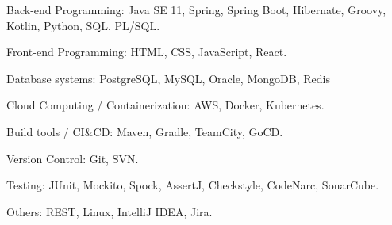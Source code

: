 

\begin{cvskills}


  \cvskill
    {Back-end Programming:} %
    {Java SE 11, Spring, Spring Boot, Hibernate, Groovy, Kotlin, Python, SQL, PL/SQL.} %

  \cvskill
    {Front-end Programming:} %
    {HTML, CSS, JavaScript, React.} %

  \cvskill
    {Database systems:} %
    {PostgreSQL, MySQL, Oracle, MongoDB, Redis} %

  \cvskill
    {Cloud Computing / Containerization:} %
    {AWS, Docker, Kubernetes.} %

  \cvskill
    {Build tools / CI\&CD:} %
    {Maven, Gradle, TeamCity, GoCD.} %

  \cvskill
    {Version Control:} %
    {Git, SVN.} %

  \cvskill
    {Testing:} %
    {JUnit, Mockito, Spock, AssertJ, Checkstyle, CodeNarc, SonarCube.} %
    
  \cvskill
    {Others:} %
    {REST, Linux, IntelliJ IDEA, Jira.} %



\end{cvskills}
